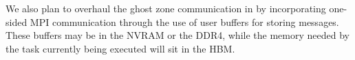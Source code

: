 We also plan to overhaul the ghost zone communication in \flash by incorporating one-sided MPI communication through the use of user buffers for storing messages.
These buffers may be in the NVRAM or the DDR4, while the memory needed by the task currently being executed will sit in the HBM.





